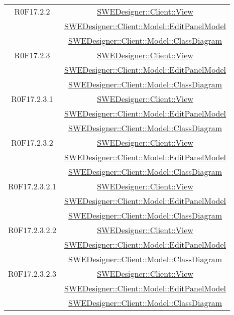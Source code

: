 \documentclass[../SpecificaTecnica.tex]{subfiles}
\begin{document}
\begin{longtable}{|c|c|}
		R0F17.2.2 & \hyperlink{SWEDesigner::Client::View}{SWEDesigner::Client::View} \\& \hyperlink{SWEDesigner::Client::Model::EditPanelModel}{SWEDesigner::Client::Model::EditPanelModel} \\& \hyperlink{SWEDesigner::Client::Model::ClassDiagram}{SWEDesigner::Client::Model::ClassDiagram}\\\hline
		R0F17.2.3 & \hyperlink{SWEDesigner::Client::View}{SWEDesigner::Client::View} \\& \hyperlink{SWEDesigner::Client::Model::EditPanelModel}{SWEDesigner::Client::Model::EditPanelModel} \\& \hyperlink{SWEDesigner::Client::Model::ClassDiagram}{SWEDesigner::Client::Model::ClassDiagram}\\\hline
		R0F17.2.3.1 & \hyperlink{SWEDesigner::Client::View}{SWEDesigner::Client::View} \\& \hyperlink{SWEDesigner::Client::Model::EditPanelModel}{SWEDesigner::Client::Model::EditPanelModel} \\& \hyperlink{SWEDesigner::Client::Model::ClassDiagram}{SWEDesigner::Client::Model::ClassDiagram}\\\hline
		R0F17.2.3.2 & \hyperlink{SWEDesigner::Client::View}{SWEDesigner::Client::View} \\& \hyperlink{SWEDesigner::Client::Model::EditPanelModel}{SWEDesigner::Client::Model::EditPanelModel} \\& \hyperlink{SWEDesigner::Client::Model::ClassDiagram}{SWEDesigner::Client::Model::ClassDiagram}\\\hline
		R0F17.2.3.2.1 & \hyperlink{SWEDesigner::Client::View}{SWEDesigner::Client::View} \\& \hyperlink{SWEDesigner::Client::Model::EditPanelModel}{SWEDesigner::Client::Model::EditPanelModel} \\& \hyperlink{SWEDesigner::Client::Model::ClassDiagram}{SWEDesigner::Client::Model::ClassDiagram}\\\hline
		R0F17.2.3.2.2 & \hyperlink{SWEDesigner::Client::View}{SWEDesigner::Client::View} \\& \hyperlink{SWEDesigner::Client::Model::EditPanelModel}{SWEDesigner::Client::Model::EditPanelModel} \\& \hyperlink{SWEDesigner::Client::Model::ClassDiagram}{SWEDesigner::Client::Model::ClassDiagram}\\\hline
		R0F17.2.3.2.3 & \hyperlink{SWEDesigner::Client::View}{SWEDesigner::Client::View} \\& \hyperlink{SWEDesigner::Client::Model::EditPanelModel}{SWEDesigner::Client::Model::EditPanelModel} \\& \hyperlink{SWEDesigner::Client::Model::ClassDiagram}{SWEDesigner::Client::Model::ClassDiagram}\\\hline

\end{longtable}
\end{document}
